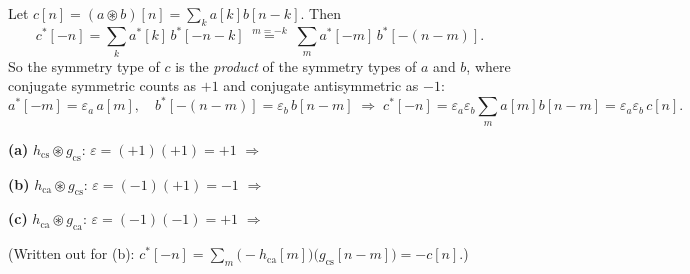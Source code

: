 
Let $c[n]=(a\circledast b)[n]=\sum_k a[k]b[n-k]$. Then
\[
c^*[-n]=\sum_k a^*[k]\,b^*[-n-k]
\;\overset{m=-k}{=}\;\sum_m a^*[-m]\,b^*[-(n-m)] .
\]
So the symmetry type of $c$ is the \emph{product} of the symmetry types of $a$ and $b$, where
conjugate symmetric counts as $+1$ and conjugate antisymmetric as $-1$:
\[
a^*[-m]=\varepsilon_a\,a[m],\quad b^*[-(n-m)]=\varepsilon_b\,b[n-m]
\;\Longrightarrow\;
c^*[-n]=\varepsilon_a\varepsilon_b\sum_m a[m]b[n-m]=\varepsilon_a\varepsilon_b\,c[n].
\]

\textbf{(a)} $h_{\mathrm{cs}}\circledast g_{\mathrm{cs}}$: $\varepsilon=(+1)(+1)=+1$
$\Rightarrow$ 

\textbf{(b)} $h_{\mathrm{ca}}\circledast g_{\mathrm{cs}}$: $\varepsilon=(-1)(+1)=-1$
$\Rightarrow$ 

\textbf{(c)} $h_{\mathrm{ca}}\circledast g_{\mathrm{ca}}$: $\varepsilon=(-1)(-1)=+1$
$\Rightarrow$ 

(Written out for (b): $c^*[-n]=\sum_m\bigl(-h_{\mathrm{ca}}[m]\bigr)\bigl(g_{\mathrm{cs}}[n-m]\bigr)=-c[n]$.)
